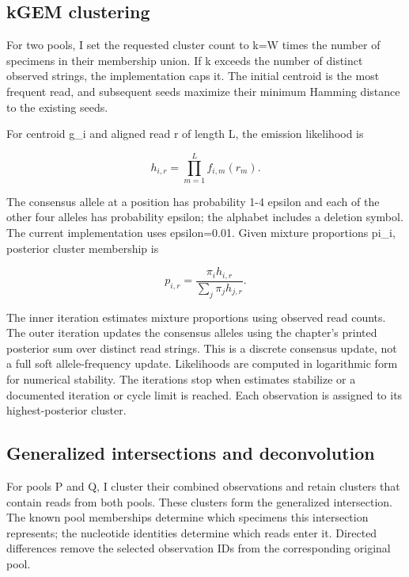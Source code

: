 \hypertarget{kgem-clustering}{%
\subsection{kGEM clustering}\label{kgem-clustering}}

For two pools, I set the requested cluster count to k=W times the number
of specimens in their membership union. If k exceeds the number of
distinct observed strings, the implementation caps it. The initial
centroid is the most frequent read, and subsequent seeds maximize their
minimum Hamming distance to the existing seeds.

For centroid g\_i and aligned read r of length L, the emission
likelihood is

\[
h_{i,r}=\prod_{m=1}^{L}f_{i,m}(r_m).
\]

The consensus allele at a position has probability 1-4 epsilon and each
of the other four alleles has probability epsilon; the alphabet includes
a deletion symbol. The current implementation uses epsilon=0.01. Given
mixture proportions pi\_i, posterior cluster membership is

\[
p_{i,r}=\frac{\pi_i h_{i,r}}{\sum_j\pi_j h_{j,r}}.
\]

The inner iteration estimates mixture proportions using observed read
counts. The outer iteration updates the consensus alleles using the
chapter's printed posterior sum over distinct read strings. This is a
discrete consensus update, not a full soft allele-frequency update.
Likelihoods are computed in logarithmic form for numerical stability.
The iterations stop when estimates stabilize or a documented iteration
or cycle limit is reached. Each observation is assigned to its
highest-posterior cluster.

\hypertarget{generalized-intersections-and-deconvolution}{%
\subsection{Generalized intersections and
deconvolution}\label{generalized-intersections-and-deconvolution}}

For pools P and Q, I cluster their combined observations and retain
clusters that contain reads from both pools. These clusters form the
generalized intersection. The known pool memberships determine which
specimens this intersection represents; the nucleotide identities
determine which reads enter it. Directed differences remove the selected
observation IDs from the corresponding original pool.

